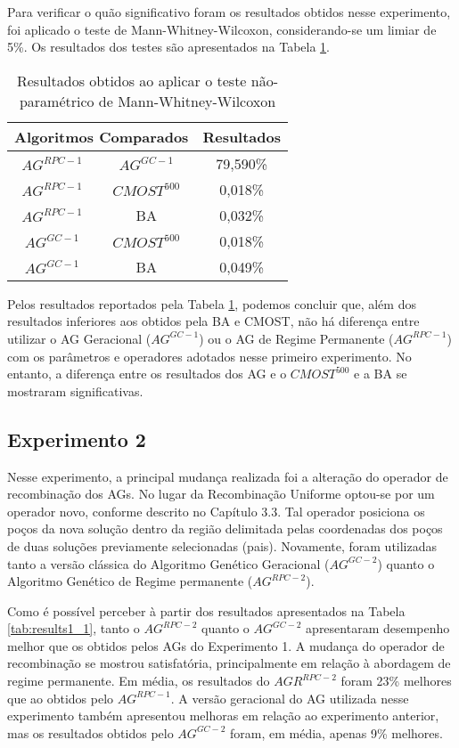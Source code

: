 Para verificar o quão significativo foram os resultados obtidos nesse experimento, foi aplicado o teste de Mann-Whitney-Wilcoxon, considerando-se um limiar de 5\%. Os resultados dos testes são apresentados na Tabela \ref{tab:mw1_1}.

\begin{table}[H]
\centering
\caption{Resultados obtidos ao aplicar o teste não-paramétrico de Mann-Whitney-Wilcoxon}
\label{tab:mw1_1}
\begin{tabular}{|c|c|c|}
\hline
\multicolumn{2}{|c|}{Algoritmos Comparados} & Resultados \\ \hline
$AG^{RPC-1}$ &	$AG^{GC-1}$ & 79,590\% \\ \hline
$AG^{RPC-1}$ & $CMOST^{500}$ & 0,018\% \\ \hline
$AG^{RPC-1}$ & BA & 0,032\% \\ \hline
$AG^{GC-1}$ & $CMOST^{500}$ & 0,018\% \\ \hline
$AG^{GC-1}$ & BA & 0,049\% \\ \hline

\end{tabular}
\end{table}

Pelos resultados reportados pela Tabela \ref{tab:mw1_1}, podemos concluir que, além dos resultados inferiores aos obtidos pela BA e CMOST, não há diferença entre utilizar o AG Geracional ($AG^{GC-1}$) ou o AG de Regime Permanente ($AG^{RPC-1}$) com os parâmetros e operadores adotados nesse primeiro experimento. No entanto, a diferença entre os resultados dos AG e o $CMOST^{500}$ e a BA se mostraram  significativas.

\subsection{Experimento 2}

Nesse experimento, a principal mudança realizada foi a alteração do operador de recombinação dos AGs. No lugar da Recombinação Uniforme optou-se por um operador novo, conforme descrito no Capítulo 3.3. Tal operador posiciona os poços da nova solução dentro da região delimitada pelas coordenadas dos poços de duas soluções previamente selecionadas (pais). Novamente, foram utilizadas tanto a versão clássica do Algoritmo Genético Geracional ($AG^{GC-2}$) quanto o Algoritmo Genético de Regime permanente ($AG^{RPC-2}$).

Como é possível perceber à partir dos resultados apresentados na Tabela \ref{tab:results1_1}, tanto o $AG^{RPC-2}$ quanto o $AG^{GC-2}$ apresentaram desempenho melhor que os obtidos pelos AGs do Experimento 1. A mudança do operador de recombinação se mostrou satisfatória, principalmente em relação à abordagem de regime permanente. Em média, os resultados do $AGR^{RPC-2}$ foram 23\% melhores que ao obtidos pelo $AG^{RPC-1}$. A versão geracional do AG utilizada nesse experimento também apresentou melhoras em relação ao experimento anterior, mas os resultados obtidos pelo $AG^{GC-2}$ foram, em média, apenas 9\% melhores.


